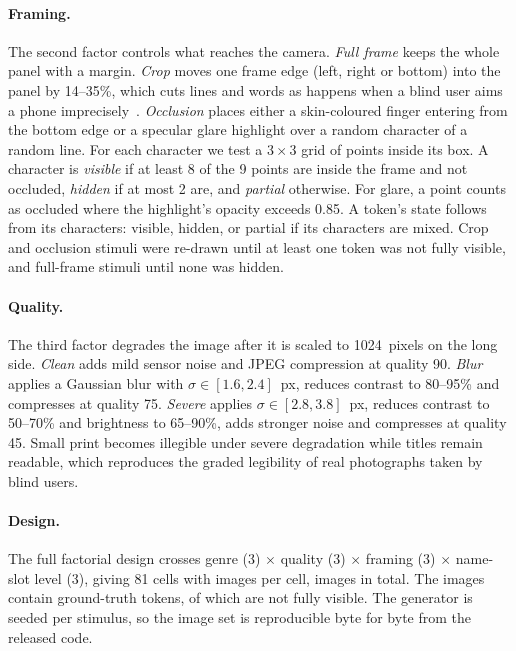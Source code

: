 \paragraph{Framing.} The second factor controls what reaches the camera. \emph{Full frame} keeps the whole panel with a margin. \emph{Crop} moves one frame edge (left, right or bottom) into the panel by 14--35\%, which cuts lines and words as happens when a blind user aims a phone imprecisely~\cite{gurari2018vizwiz}. \emph{Occlusion} places either a skin-coloured finger entering from the bottom edge or a specular glare highlight over a random character of a random line. For each character we test a $3\times3$ grid of points inside its box. A character is \emph{visible} if at least 8 of the 9 points are inside the frame and not occluded, \emph{hidden} if at most 2 are, and \emph{partial} otherwise. For glare, a point counts as occluded where the highlight's opacity exceeds 0.85. A token's state follows from its characters: visible, hidden, or partial if its characters are mixed. Crop and occlusion stimuli were re-drawn until at least one token was not fully visible, and full-frame stimuli until none was hidden.

\paragraph{Quality.} The third factor degrades the image after it is scaled to 1024~pixels on the long side. \emph{Clean} adds mild sensor noise and JPEG compression at quality 90. \emph{Blur} applies a Gaussian blur with $\sigma\in[1.6,2.4]$~px, reduces contrast to 80--95\% and compresses at quality 75. \emph{Severe} applies $\sigma\in[2.8,3.8]$~px, reduces contrast to 50--70\% and brightness to 65--90\%, adds stronger noise and compresses at quality 45. Small print becomes illegible under severe degradation while titles remain readable, which reproduces the graded legibility of real photographs taken by blind users.

\paragraph{Design.} The full factorial design crosses genre (3) $\times$ quality (3) $\times$ framing (3) $\times$ name-slot level (3), giving 81 cells with \NImgPerCell{} images per cell, \NImages{} images in total. The images contain \NGTTokens{} ground-truth tokens, of which \NGTNotVisible{} are not fully visible. The generator is seeded per stimulus, so the image set is reproducible byte for byte from the released code.



